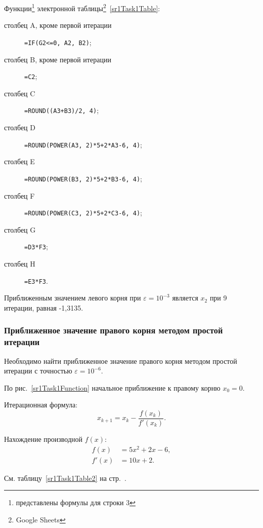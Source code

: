 \documentclass[10pt, a4paper, titlepage]{article}
\begin{document}
Функции\footnote{представлены формулы для строки 3} электронной таблицы\footnote{Google Sheets}~\ref{sr1Task1Table}:
\begin{description}
    \item[столбец A, кроме первой итерации] \verb"=IF(G2<=0, A2, B2)";
    
    \item[столбец B, кроме первой итерации] \verb"=C2";
    
    \item[столбец C] \verb"=ROUND((A3+B3)/2, 4)";
    
    \item[столбец D] \verb"=ROUND(POWER(A3, 2)*5+2*A3-6, 4)";
    
    \item[столбец E] \verb"=ROUND(POWER(B3, 2)*5+2*B3-6, 4)";
    
    \item[столбец F] \verb"=ROUND(POWER(C3, 2)*5+2*C3-6, 4)";
    
    \item[столбец G] \verb"=D3*F3";
    
    \item[столбец H] \verb"=E3*F3".

\end{description}

Приближенным значением левого корня при $\varepsilon=10^{-3}$ является $x_2$ при 9 итерации, равная -1,3135.

\subsubsection*{Приближенное значение правого корня методом простой итерации}

Необходимо найти приближенное значение правого корня методом простой итерации с точностью $\varepsilon=10^{-6}$.

По рис.~\ref{sr1Task1Function} начальное приближение к правому корню $x_0=0$.

Итерационная формула: $$x_{k+1}=x_k-\frac{f(x_k)}{f'(x_k)} .$$

Нахождение производной $f(x)$:
\begin{align*}
    f(x) &= 5x^2+2x-6, \\
    f'(x) &= 10x+2.
\end{align*}

См. таблицу~\ref{sr1Task1Table2} на стр.~\pageref{sr1Task1Table2}.
\end{document}
